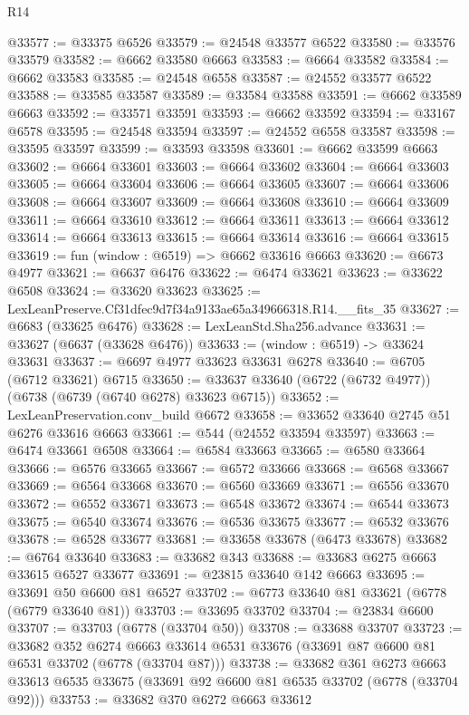 \begin{lexlean}{R14}
\begin{coremodule}
@33577 := @33375 @6526
@33579 := @24548 @33577 @6522
@33580 := @33576 @33579
@33582 := @6662 @33580 @6663
@33583 := @6664 @33582
@33584 := @6662 @33583
@33585 := @24548 @6558
@33587 := @24552 @33577 @6522
@33588 := @33585 @33587
@33589 := @33584 @33588
@33591 := @6662 @33589 @6663
@33592 := @33571 @33591
@33593 := @6662 @33592
@33594 := @33167 @6578
@33595 := @24548 @33594
@33597 := @24552 @6558 @33587
@33598 := @33595 @33597
@33599 := @33593 @33598
@33601 := @6662 @33599 @6663
@33602 := @6664 @33601
@33603 := @6664 @33602
@33604 := @6664 @33603
@33605 := @6664 @33604
@33606 := @6664 @33605
@33607 := @6664 @33606
@33608 := @6664 @33607
@33609 := @6664 @33608
@33610 := @6664 @33609
@33611 := @6664 @33610
@33612 := @6664 @33611
@33613 := @6664 @33612
@33614 := @6664 @33613
@33615 := @6664 @33614
@33616 := @6664 @33615
@33619 := fun (window : @6519) => @6662 @33616 @6663
@33620 := @6673 @4977
@33621 := @6637 @6476
@33622 := @6474 @33621
@33623 := @33622 @6508
@33624 := @33620 @33623
@33625 := LexLeanPreserve.Cf31dfec9d7f34a9133ae65a349666318.R14.__fits_35
@33627 := @6683 (@33625 @6476)
@33628 := LexLeanStd.Sha256.advance
@33631 := @33627 (@6637 (@33628 @6476))
@33633 := (window : @6519) -> @33624 @33631
@33637 := @6697 @4977 @33623 @33631 @6278
@33640 := @6705 (@6712 @33621) @6715
@33650 := @33637 @33640 (@6722 (@6732 @4977)) (@6738 (@6739 (@6740 @6278) @33623 @6715))
@33652 := LexLeanPreservation.conv_build @6672
@33658 := @33652 @33640 @2745 @51 @6276 @33616 @6663
@33661 := @544 (@24552 @33594 @33597)
@33663 := @6474 @33661 @6508
@33664 := @6584 @33663
@33665 := @6580 @33664
@33666 := @6576 @33665
@33667 := @6572 @33666
@33668 := @6568 @33667
@33669 := @6564 @33668
@33670 := @6560 @33669
@33671 := @6556 @33670
@33672 := @6552 @33671
@33673 := @6548 @33672
@33674 := @6544 @33673
@33675 := @6540 @33674
@33676 := @6536 @33675
@33677 := @6532 @33676
@33678 := @6528 @33677
@33681 := @33658 @33678 (@6473 @33678)
@33682 := @6764 @33640
@33683 := @33682 @343
@33688 := @33683 @6275 @6663 @33615 @6527 @33677
@33691 := @23815 @33640 @142 @6663
@33695 := @33691 @50 @6600 @81 @6527
@33702 := @6773 @33640 @81 @33621 (@6778 (@6779 @33640 @81))
@33703 := @33695 @33702
@33704 := @23834 @6600
@33707 := @33703 (@6778 (@33704 @50))
@33708 := @33688 @33707
@33723 := @33682
    @352
    @6274
    @6663
    @33614
    @6531
    @33676
    (@33691 @87 @6600 @81 @6531 @33702 (@6778 (@33704 @87)))
@33738 := @33682
    @361
    @6273
    @6663
    @33613
    @6535
    @33675
    (@33691 @92 @6600 @81 @6535 @33702 (@6778 (@33704 @92)))
@33753 := @33682
    @370
    @6272
    @6663
    @33612

\end{coremodule}
\end{lexlean}
